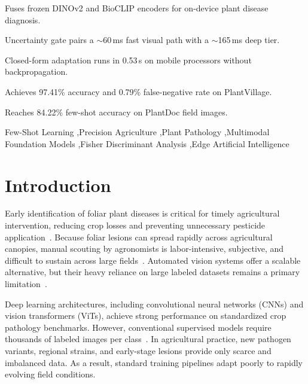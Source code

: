 \documentclass[preprint,12pt]{elsarticle}
\begin{document}
\begin{frontmatter}
\begin{highlights}
\item Fuses frozen DINOv2 and BioCLIP encoders for on-device plant disease diagnosis.
\item Uncertainty gate pairs a $\sim$60\,ms fast visual path with a $\sim$165\,ms deep tier.
\item Closed-form adaptation runs in 0.53\,s on mobile processors without backpropagation.
\item Achieves 97.41\% accuracy and 0.79\% false-negative rate on PlantVillage.
\item Reaches 84.22\% few-shot accuracy on PlantDoc field images.
\end{highlights}

\begin{keyword}
Few-Shot Learning \sep Precision Agriculture \sep Plant Pathology \sep Multimodal Foundation Models \sep Fisher Discriminant Analysis \sep Edge Artificial Intelligence
\end{keyword}

\end{frontmatter}



\section{Introduction}
\label{sec:intro}
Early identification of foliar plant diseases is critical for timely agricultural intervention, reducing crop losses and preventing unnecessary pesticide application~\cite{richard2022control,shafik2023systematic}. Because foliar lesions can spread rapidly across agricultural canopies, manual scouting by agronomists is labor-intensive, subjective, and difficult to sustain across large fields~\cite{shoaib2023advanced}. Automated vision systems offer a scalable alternative, but their heavy reliance on large labeled datasets remains a primary limitation~\cite{shoaib2023advanced}.

Deep learning architectures, including convolutional neural networks (CNNs) and vision transformers (ViTs), achieve strong performance on standardized crop pathology benchmarks. However, conventional supervised models require thousands of labeled images per class~\cite{shoaib2023advanced}. In agricultural practice, new pathogen variants, regional strains, and early-stage lesions provide only scarce and imbalanced data. As a result, standard training pipelines adapt poorly to rapidly evolving field conditions.
\end{document}
